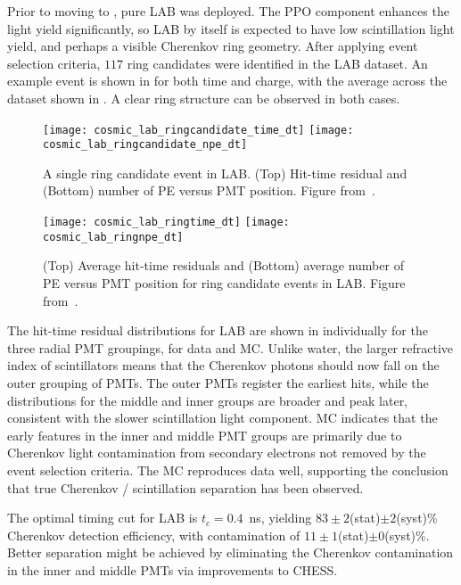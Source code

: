 Prior to moving to {\labppo}, pure LAB was deployed. 
The PPO component enhances the light yield significantly, so LAB by itself is expected to have low scintillation light yield, and perhaps a visible Cherenkov ring geometry.
After applying event selection criteria, $117$ ring candidates were identified in the LAB dataset. 
An example event is shown in  for both time and charge, with the average across the dataset shown in . 
A clear ring structure can be observed in both cases. 

\begin{figure}
	\centering
	\texttt{[image: cosmic\_lab\_ringcandidate\_time\_dt]}
	\texttt{[image: cosmic\_lab\_ringcandidate\_npe\_dt]}
	\caption{A single ring candidate event in LAB. (Top) Hit-time residual and (Bottom) number of PE versus PMT position. Figure from~\cite{chess_lab}.}
	\label{fig:lab_ring}
\end{figure}

\begin{figure}
	\centering
	\texttt{[image: cosmic\_lab\_ringtime\_dt]}
	\texttt{[image: cosmic\_lab\_ringnpe\_dt]}
	\caption{(Top) Average hit-time residuals and (Bottom) average number of PE versus PMT position for ring candidate events in LAB. Figure from~\cite{chess_lab}.}
	\label{fig:lab2}
\end{figure}


The hit-time residual distributions for LAB are shown in  individually for the three radial PMT groupings, for data and MC. 
Unlike water, the larger refractive index of scintillators means that the Cherenkov photons should now fall on the outer grouping of PMTs.
The outer PMTs register the earliest hits, while the distributions for the middle and inner groups are broader and peak later, consistent with the slower scintillation light component. 
MC indicates that the early features in the inner and middle PMT groups are primarily due to Cherenkov light contamination from secondary electrons not removed by the event selection criteria.
The MC reproduces data well, supporting the conclusion that true Cherenkov / scintillation separation has been observed. 

The optimal timing cut for LAB is $ t_c = 0.4$~ns,  yielding $83\pm2$(stat)$\pm2$(syst)\% Cherenkov detection efficiency, with contamination of $11\pm1$(stat)$\pm0$(syst)\%. 
Better separation might be achieved by eliminating the Cherenkov contamination in the inner and middle PMTs via improvements to CHESS.

